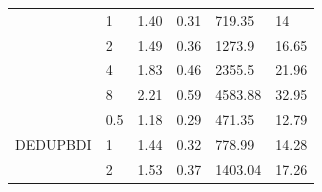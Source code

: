 \begin{table}[]
{\begin{tabular}{llllll}
    \multicolumn{1}{l|}{}                          & \multicolumn{1}{l|}{1}   & 1.40                                                                          & 0.31                                                                               & 719.35                                                                         & 14                      \\
    \multicolumn{1}{l|}{}                          & \multicolumn{1}{l|}{2}   & 1.49                                                                          & 0.36                                                                               & 1273.9                                                                        & 16.65                      \\
    \multicolumn{1}{l|}{}                          & \multicolumn{1}{l|}{4}   & 1.83                                                                          & 0.46                                                                               & 2355.5                                                                         & 21.96                      \\
    \multicolumn{1}{l|}{}                          & \multicolumn{1}{l|}{8}   & 2.21                                                                          & 0.59                                                                               & 4583.88                                                                         & 32.95                      \\ \cline{1-2}
    \multicolumn{1}{c|}{\multirow{5}{*}{DEDUPBDI}} & \multicolumn{1}{l|}{0.5} & 1.18                                                                          & 0.29                                                                               & 471.35                                                                         & 12.79                      \\
    \multicolumn{1}{c|}{}                          & \multicolumn{1}{l|}{1}   & 1.44                                                                          & 0.32                                                                               & 778.99                                                                         & 14.28                      \\
    \multicolumn{1}{c|}{}                          & \multicolumn{1}{l|}{2}   & 1.53                                                                          & 0.37                                                                               & 1403.04                                                                        & 17.26                      \\

\end{tabular}}
\end{table}
